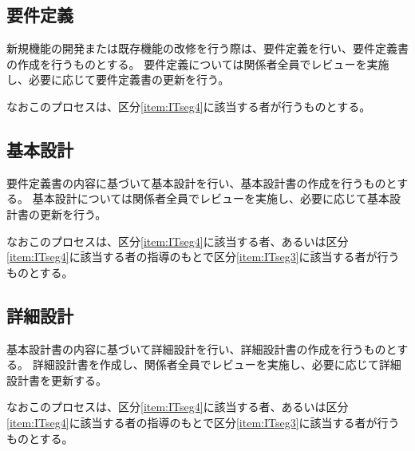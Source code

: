 



\subsection{要件定義}
新規機能の開発または既存機能の改修を行う際は、要件定義を行い、要件定義書の作成を行うものとする。
要件定義については関係者全員でレビューを実施し、必要に応じて要件定義書の更新を行う。

なおこのプロセスは、区分\ref{item:ITseg4}\hx に該当する者が行うものとする。

\subsection{基本設計}
要件定義書の内容に基づいて基本設計を行い、基本設計書の作成を行うものとする。
基本設計については関係者全員でレビューを実施し、必要に応じて基本設計書の更新を行う。

なおこのプロセスは、区分\ref{item:ITseg4}\hx に該当する者、あるいは区分\ref{item:ITseg4}\hx に該当する者の指導のもとで区分\ref{item:ITseg3}\hx に該当する者が行うものとする。

\subsection{詳細設計}
基本設計書の内容に基づいて詳細設計を行い、詳細設計書の作成を行うものとする。
詳細設計書を作成し、関係者全員でレビューを実施し、必要に応じて詳細設計書を更新する。

なおこのプロセスは、区分\ref{item:ITseg4}\hx に該当する者、あるいは区分\ref{item:ITseg4}\hx に該当する者の指導のもとで区分\ref{item:ITseg3}\hx に該当する者が行うものとする。

